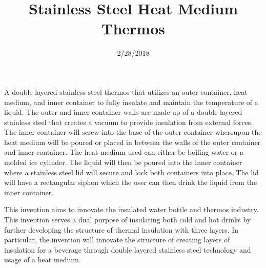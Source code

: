 \documentclass[english]{uspatent}
\begin{document}
\setPrintingModeApplication



\title{Stainless Steel Heat Medium Thermos}
\date{2/28/2018}

\maketitle

A double layered stainless steel thermos that utilizes an outer container, heat medium, and inner container to fully insulate and maintain the temperature of a liquid. The outer and inner container walls are made up of a double-layered stainless steel that creates a vacuum to provide insulation from external forces. The inner container will screw into the base of the outer container whereupon the heat medium will be poured or placed in between the walls of the outer container and inner container. The heat medium used can either be boiling water or a molded ice cylinder. The liquid will then be poured into the inner container where a stainless steel lid will secure and lock both containers into place. The lid will have a rectangular siphon which the user can then drink the liquid from the inner container.


This invention aims to innovate the insulated water bottle and thermos industry. This invention serves a dual purpose of insulating both cold and hot drinks by further developing the structure of thermal insulation with three layers. In particular, the invention will innovate the structure of creating layers of insulation for a beverage through double layered stainless steel technology and usage of a heat medium.

\end{document}
